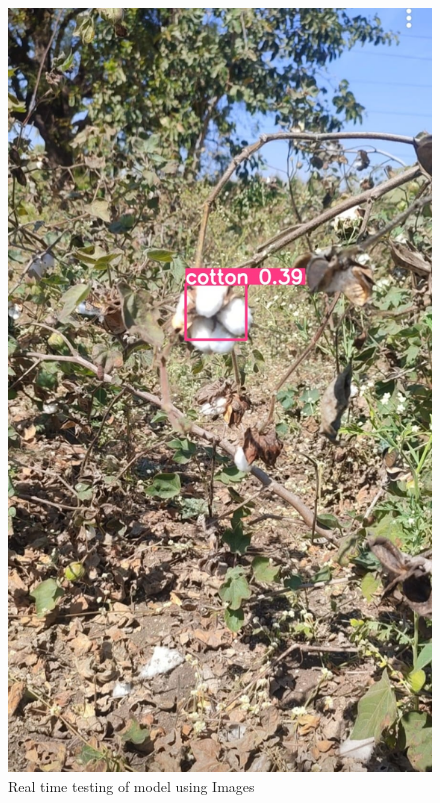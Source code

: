 \documentclass[12pt,a4paper]{report}
\begin{document}
\begin{figure}[H]
\begin{center}
\includegraphics[scale=0.2]{images/results/9.jpg.jpg}
\caption{Real time testing of model using Images}
\end{center}
\end{figure}
\end{document}
